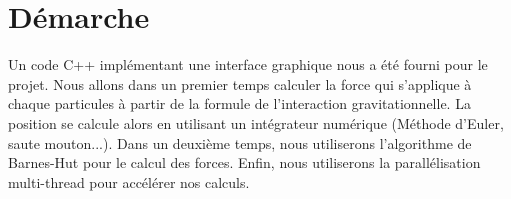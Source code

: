 \section{Démarche}

Un code C++ implémentant une interface graphique nous a été fourni pour le projet.
Nous allons dans un premier temps calculer la force qui s'applique à chaque particules à partir de la formule de l'interaction gravitationnelle. La position se calcule alors en utilisant un intégrateur numérique (Méthode d'Euler, saute mouton...).
Dans un deuxième temps, nous utiliserons l'algorithme de Barnes-Hut pour le calcul des forces.
Enfin, nous utiliserons la parallélisation multi-thread pour accélérer nos calculs.

